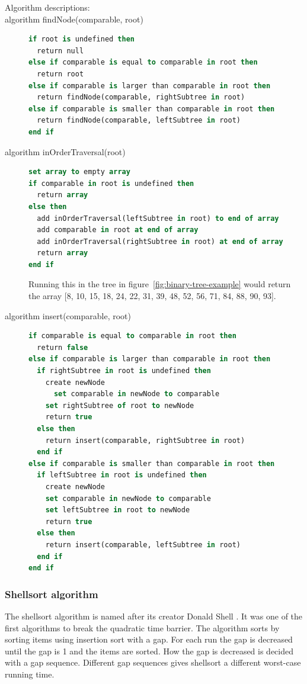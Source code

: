\documentclass {article}
\begin{document}
\begin{description}
\item[Algorithm descriptions:]
\item [algorithm findNode(comparable, root)]
\item[]
\begin{lstlisting}[language=Pascal]
if root is undefined then
  return null
else if comparable is equal to comparable in root then
  return root
else if comparable is larger than comparable in root then
  return findNode(comparable, rightSubtree in root)
else if comparable is smaller than comparable in root then
  return findNode(comparable, leftSubtree in root)
end if
\end{lstlisting}

\item [algorithm inOrderTraversal(root)]
\item []
\begin{lstlisting}[language=Pascal]
set array to empty array
if comparable in root is undefined then
  return array
else then
  add inOrderTraversal(leftSubtree in root) to end of array
  add comparable in root at end of array
  add inOrderTraversal(rightSubtree in root) at end of array
  return array
end if
\end{lstlisting}

\item[] Running this in the tree in figure~\ref{fig:binary-tree-example} would return the array [8, 10, 15, 18, 24, 22, 31, 39, 48, 52, 56, 71, 84, 88, 90, 93].

\item [algorithm insert(comparable, root)]
\item []
\begin{lstlisting}[language=Pascal]
if comparable is equal to comparable in root then
  return false
else if comparable is larger than comparable in root then
  if rightSubtree in root is undefined then
    create newNode
	  set comparable in newNode to comparable
    set rightSubtree of root to newNode
    return true
  else then
    return insert(comparable, rightSubtree in root)
  end if
else if comparable is smaller than comparable in root then
  if leftSubtree in root is undefined then 
    create newNode
    set comparable in newNode to comparable
    set leftSubtree in root to newNode
    return true
  else then
    return insert(comparable, leftSubtree in root)
  end if
end if
\end{lstlisting}
\end{description}
\subsubsection{Shellsort algorithm}
The shellsort algorithm is named after its creator Donald Shell \cite{weiss}. It was one of the first algorithms to break the quadratic time barrier. The algorithm sorts by sorting items using insertion sort with a gap. For each run the gap is decreased until the gap is 1 and the items are sorted. How the gap is decreased is decided with a gap sequence. Different gap sequences gives shellsort a different worst-case running time.
 
\end{document}
